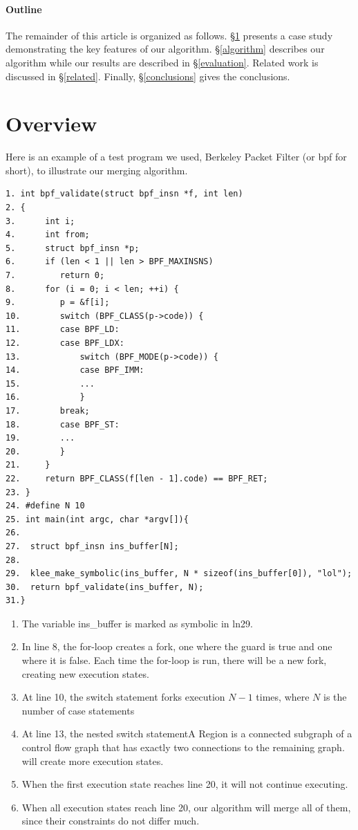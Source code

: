 \documentclass[12pt,a4paper]{article}
\begin{document}
\paragraph{Outline}

The remainder of this article is organized as follows. \S\ref{overview} presents a case study demonstrating the key features of our algorithm. \S\ref{algorithm} describes our algorithm while our results are described in \S\ref{evaluation}. Related work is discussed in \S\ref{related}. Finally, \S\ref{conclusions} gives the conclusions.

\section{Overview}\label{overview}
Here is an example of a test program we used, Berkeley Packet Filter (or bpf for short), to illustrate our merging algorithm.

\begin{verbatim}
1. int bpf_validate(struct bpf_insn *f, int len)
2. {
3.      int i;
4.      int from;
5.      struct bpf_insn *p;
6.      if (len < 1 || len > BPF_MAXINSNS)
7.         return 0;
8.      for (i = 0; i < len; ++i) {
9.         p = &f[i];
10.        switch (BPF_CLASS(p->code)) {
11.        case BPF_LD:
12.        case BPF_LDX:
13.            switch (BPF_MODE(p->code)) {
14.            case BPF_IMM:
15.            ...
16.            }
17.        break;
18.        case BPF_ST:
19.        ...
20.        }
21.     }
22.     return BPF_CLASS(f[len - 1].code) == BPF_RET;
23. }
24. #define N 10 
25. int main(int argc, char *argv[]){  
26.
27.  struct bpf_insn ins_buffer[N];
28.
29.  klee_make_symbolic(ins_buffer, N * sizeof(ins_buffer[0]), "lol");
30.  return bpf_validate(ins_buffer, N);
31.}
\end{verbatim}

\begin{enumerate}
\item The variable ins\_buffer is marked as symbolic in ln29. 
\item In line 8, the for-loop creates a fork, one where the guard is true and one where it is false. Each time the for-loop is run, there will be a new fork, creating new execution states. 
\item At line 10, the switch statement forks execution $N-1$ times, where $N$ is the number of case statements
\item At line 13, the nested switch statementA Region is a connected subgraph of a control flow graph that has exactly two connections to the remaining graph. will create more execution states. 
\item When the first execution state reaches line 20, it will not continue executing.
\item When all execution states reach line 20, our algorithm will merge all of them, since their constraints do not differ much.
\end{enumerate}
\end{document}
